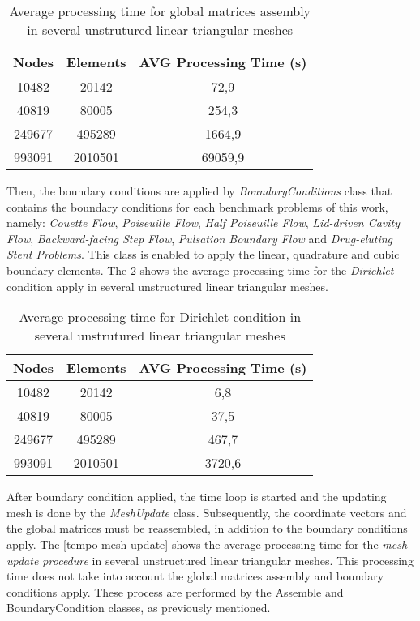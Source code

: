 \vspace{0.5cm}
\begin{table}[H]
\centering
\begin{tabular}{ccc}
\toprule
\textbf{Nodes} & \textbf{Elements} & \textbf{AVG Processing Time} (s) \\
\midrule
10482 & 20142 & 72,9 \\
40819 & 80005 & 254,3 \\
249677 & 495289 & 1664,9 \\
993091 & 2010501 & 69059,9 \\

\bottomrule
\end{tabular}
\caption{Average processing time for global matrices assembly in several unstrutured linear triangular meshes}
\label{tempo matrizes globais}
\end{table}


\medskip
Then, the boundary conditions are applied by \textit{BoundaryConditions} class
that contains the boundary conditions
for each benchmark problems of this
work, namely:
\textit{Couette Flow}, 
\textit{Poiseuille Flow}, 
\textit{Half Poiseuille Flow}, 
\textit{Lid-driven Cavity Flow}, 
\textit{Backward-facing Step Flow}, 
\textit{Pulsation Boundary Flow} and
\textit{Drug-eluting Stent Problems}. 
This class is enabled to apply 
the linear, quadrature and cubic boundary elements.
The \ref{tempo contorno} 
shows the average processing time for the \textit{Dirichlet} 
condition apply in several unstructured linear triangular meshes.

\vspace{0.5cm}
\begin{table}[H]
\centering
\begin{tabular}{ccc}
\toprule
\textbf{Nodes} & \textbf{Elements} & \textbf{AVG Processing Time} (s) \\
\midrule
10482 & 20142 & 6,8 \\
40819 & 80005 & 37,5 \\
249677 & 495289 & 467,7 \\
993091 & 2010501 & 3720,6 \\
\bottomrule
\end{tabular}
\caption{Average processing time for Dirichlet condition in several unstrutured linear triangular meshes}
\label{tempo contorno}
\end{table}
 
\medskip
After boundary condition applied, the time loop is started and
the updating mesh is done by the \textit{MeshUpdate} class.
Subsequently, the coordinate vectors and the global matrices
must be reassembled, in addition to the boundary conditions apply.
The \ref{tempo mesh update} 
shows the average processing time for the \textit{mesh update procedure}
in several unstructured linear triangular meshes.
This processing time does not take into account the global matrices assembly and
boundary conditions apply. These process are performed by the
Assemble and BoundaryCondition classes, as previously mentioned. 

